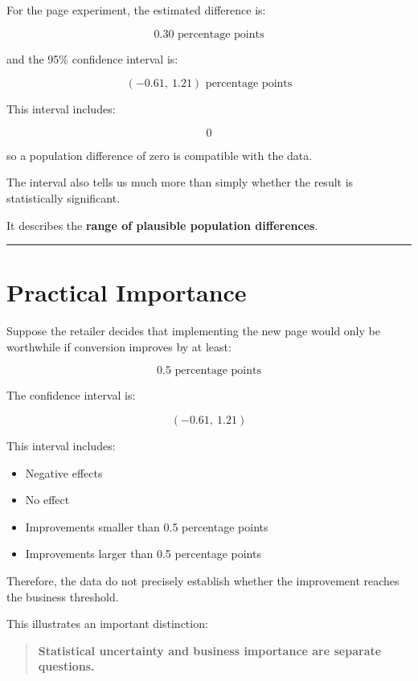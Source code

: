\documentclass[
  letterpaper,
  DIV=11,
  numbers=noendperiod]{scrreprt}
\providecommand{\tightlist}{%
  \setlength{\itemsep}{0pt}\setlength{\parskip}{0pt}}
\begin{document}
For the page experiment, the estimated difference is:

\[
0.30\text{ percentage points}
\]

and the 95\% confidence interval is:

\[
\boxed{
(-0.61,\ 1.21)
\text{ percentage points}
}
\]

This interval includes:

\[
0
\]

so a population difference of zero is compatible with the data.

The interval also tells us much more than simply whether the result is
statistically significant.

It describes the \textbf{range of plausible population differences}.

\begin{center}\rule{0.5\linewidth}{0.5pt}\end{center}


\chapter{Practical Importance}\label{practical-importance}

Suppose the retailer decides that implementing the new page would only
be worthwhile if conversion improves by at least:

\[
0.5\text{ percentage points}
\]

The confidence interval is:

\[
(-0.61,\ 1.21)
\]

This interval includes:

\begin{itemize}
\tightlist
\item
  Negative effects
\item
  No effect
\item
  Improvements smaller than 0.5 percentage points
\item
  Improvements larger than 0.5 percentage points
\end{itemize}

Therefore, the data do not precisely establish whether the improvement
reaches the business threshold.

This illustrates an important distinction:

\begin{quote}
\textbf{Statistical uncertainty and business importance are separate
questions.}
\end{quote}
\end{document}
